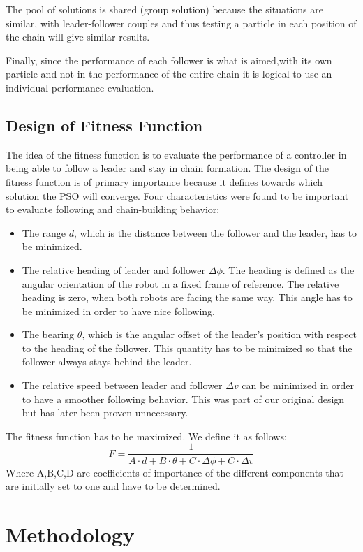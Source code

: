 \documentclass[a4paper, 10pt, conference]{ieeeconf}      %
\begin{document}
The pool of solutions is shared (group solution) because the situations are similar, with leader-follower couples and thus testing a particle in each position of the chain will give similar results.

Finally, since the performance of each follower is what is aimed,with its own particle and not in the performance of the entire chain it is logical to use an individual performance evaluation.

\subsection{Design of Fitness Function}
The idea of the fitness function is to evaluate the performance of a controller in being able to follow a leader and stay in chain formation. The design of the fitness function is of primary importance because it defines towards which solution the PSO will converge. Four characteristics were found to be important to evaluate following and chain-building behavior:
\begin{itemize}
\item The range $d$, which is the distance between the follower and the leader, has to be minimized.
\item The relative heading of leader and follower $\Delta \phi $. The heading is defined as the angular orientation of the robot in a fixed frame of reference. The relative heading is zero, when both robots are facing the same way. This angle has to be minimized in order to have nice following. 
\item The bearing $\theta $, which is the angular offset of the leader's position with respect to the heading of the follower. This quantity has to be minimized so that the follower always stays behind the leader.
\item The relative speed between leader and follower $\Delta v $ can be minimized in order to have a smoother following behavior. This was part of our original design but has later been proven unnecessary.
\end{itemize}
The fitness function has to be maximized. We define it as follows:
\begin{equation}\label{fitness}
F=\frac{1}{A \cdot d+B \cdot \theta+C \cdot \Delta \phi+C \cdot \Delta v}
\end{equation}
Where A,B,C,D are coefficients of importance of the different components that are initially set to one and have to be determined.

\section{Methodology}
\end{document}
